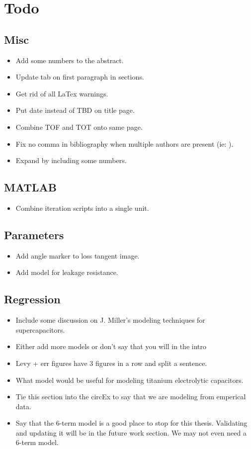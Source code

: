 \section{Todo}

\subsection{Misc}
\begin{itemize}
    \item Add some numbers to the abstract.
    \item Update tab on first paragraph in sections.
    \item Get rid of all LaTex warnings.
    \item Put date instead of TBD on title page.
    \item Combine TOF and TOT onto same page.
    \item Fix no comma in bibliography when multiple authors are present (ie: \cite{absCircuit}).
    \item Expand  by including some numbers.
\end{itemize}

\subsection{MATLAB}
\begin{itemize}
    \item Combine iteration scripts into a single unit.
\end{itemize}

\subsection{Parameters}
\begin{itemize}
    \item Add angle marker to loss tangent image.
    \item Add model for leakage resistance.
\end{itemize}

\subsection{Regression}
\begin{itemize}
    \item Include some discussion on J. Miller's modeling techniques for supercapacitors.
    \item Either add more models or don't say that you will in the intro
    \item Levy + err figures have 3 figures in a row and split a sentence.
    \item What model would be useful for modeling titanium electrolytic capacitors.
    \item Tie this section into the circEx to say that we are modeling from emperical data.
    \item Say that the 6-term model is a good place to stop for this thesis. Validating and updating it will be in the future work section. We may not even need a 6-term model.
\end{itemize}


